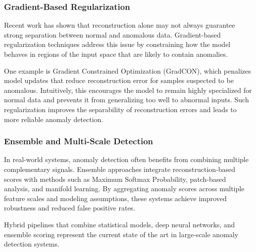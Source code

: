 \documentclass{article}
\begin{document}
\subsubsection{Gradient-Based Regularization}

Recent work has shown that reconstruction alone may not always guarantee strong
separation between normal and anomalous data. Gradient-based regularization
techniques address this issue by constraining how the model behaves in regions
of the input space that are likely to contain anomalies.

One example is Gradient Constrained Optimization (GradCON), which penalizes
model updates that reduce reconstruction error for samples suspected to be
anomalous. Intuitively, this encourages the model to remain highly specialized
for normal data and prevents it from generalizing too well to abnormal inputs.
Such regularization improves the separability of reconstruction errors and
leads to more reliable anomaly detection.

\subsubsection{Ensemble and Multi-Scale Detection}

In real-world systems, anomaly detection often benefits from combining multiple
complementary signals. Ensemble approaches integrate reconstruction-based
scores with methods such as Maximum Softmax Probability, patch-based analysis,
and manifold learning. By aggregating anomaly scores across multiple feature
scales and modeling assumptions, these systems achieve improved robustness and
reduced false positive rates.

Hybrid pipelines that combine statistical models, deep neural networks, and
ensemble scoring represent the current state of the art in large-scale anomaly
detection systems.


    
    
\end{document}
